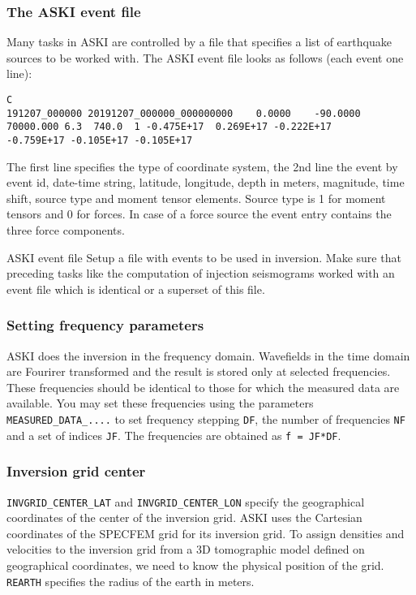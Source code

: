 \subsubsection{The ASKI event file}
\label{sec:aski-events}
%
Many tasks in ASKI are controlled by a file that specifies a list of earthquake sources to be worked with. The ASKI event file looks as follows (each event one line):
\begin{verbatim}
C
191207_000000 20191207_000000_000000000    0.0000    -90.0000
70000.000 6.3  740.0  1 -0.475E+17  0.269E+17 -0.222E+17
-0.759E+17 -0.105E+17 -0.105E+17
\end{verbatim}
The first line specifies the type of coordinate system, the 2nd line the event by event id, date-time string, latitude, longitude, depth in meters, magnitude, time shift, source type and moment tensor elements. Source type is 1 for moment tensors and 0 for forces. In case of a force source the event entry contains the three force components.
%
 \begin{actionbox}[label={action:event-file},float=h!]{ASKI event file}
    Setup a file with events to be used in inversion. Make sure that preceding tasks like the computation of injection seismograms worked with an event file which is identical or a superset of this file.
 \end{actionbox}
%
\subsubsection{Setting frequency parameters}
%
ASKI does the inversion in the frequency domain. Wavefields in the time domain are Fourirer transformed and the result is stored only at selected frequencies. These frequencies should be identical to those for which the measured data are available. You may set these frequencies using the parameters \verb+MEASURED_DATA_....+ to set frequency stepping \verb+DF+, the number of frequencies \verb+NF+ and a set of indices \verb+JF+. The frequencies are obtained as \verb+f = JF*DF+.
%
\subsubsection{Inversion grid center}
%
\verb+INVGRID_CENTER_LAT+ and \verb+INVGRID_CENTER_LON+ specify the geographical coordinates of the center of the inversion grid. ASKI uses the Cartesian coordinates of the SPECFEM grid for its inversion grid. To assign densities and velocities to the inversion grid from a 3D tomographic model defined on geographical coordinates, we need to know the physical position of the grid. \verb+REARTH+ specifies the radius of the earth in meters.
%

